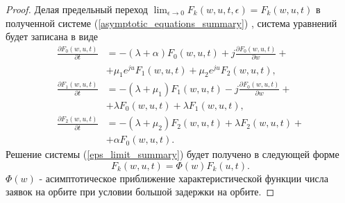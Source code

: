 \begin{proof}
	Делая предельный переход $ \lim_{\epsilon \xrightarrow{} 0} F_{k}(w,u,t,\epsilon) = F_{k}(w,u,t)$  в полученной системе (\ref{asymptotic_equations_summary}) , система уравнений будет записана в виде
	\begin{equation} \label{eps_limit_summary}
		\begin{split}
			\frac{{\partial F_{0}(w,u,t)}}{{\partial t}} &= -(\lambda + \alpha)F_{0}(w,u,t) + j
			\frac{{\partial F_{0}(w,u,t)}}{{\partial w}} +\\  &+ \mu_{1} e^{ju}F_{1}(w,u,t) + \mu_{2}e^{ju}F_{2}(w,u,t) ,
			\\
			\frac{{\partial F_{1}(w,u,t)}}{{\partial t}} &= -(\lambda + \mu_{1})F_{1}(w,u,t) - j 
			\frac{{\partial F_{0}(w,u,t)}}{{\partial w}} +\\  &+ \lambda F_{0}(w,u,t) + \lambda F_{1}(w,u,t),
			\\
			\frac{{\partial F_{2}(w,u,t)}}{{\partial t}} &= -(\lambda + \mu_{2})F_{2}(w,u,t)  + \lambda F_{2}(w,u,t) +\\  &+ \alpha F_{0}(w,u,t).
		\end{split}
	\end{equation}  
	Решение системы (\ref{eps_limit_summary}) будет получено в следующей форме
	\begin{equation} \label{solution_form_summary}
		F_{k}(w,u,t) = \Phi(w)F_{k}(u,t).
	\end{equation}  
	$\Phi(w)$ - асимптотическое приближение характеристической функции числа заявок на орбите при условии большой задержки на орбите.
	

\end{proof}
